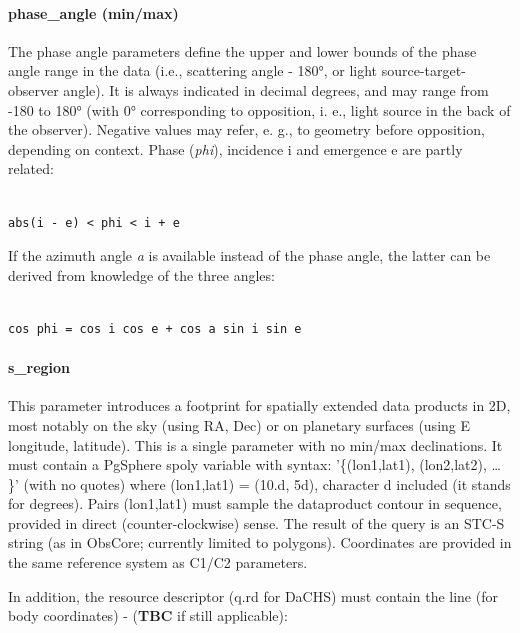 \documentclass[11pt,a4paper]{ivoa}
\begin{document}
\paragraph{phase\_angle (min/max)}

The phase angle parameters define the upper and lower bounds of the phase angle range in the data (i.e., scattering angle - 180°, or light source-target-observer angle). It is always indicated in decimal degrees, and may range from -180 to 180° (with 0° corresponding to opposition, i. e., light source in the back of the observer). Negative values may refer, e. g., to geometry before opposition, depending on context. Phase (\emph{phi}), incidence i and emergence e are partly related:

\begin{verbatim}

abs(i - e) < phi < i + e

\end{verbatim}

If the azimuth angle \emph{a} is available instead of the phase angle, the latter can be derived from knowledge of the three angles:

\begin{verbatim}

cos phi = cos i cos e + cos a sin i sin e

\end{verbatim}

\paragraph{s\_region}

This parameter introduces a footprint for spatially extended data products in 2D, most notably on the sky (using RA, Dec) or on planetary surfaces (using E longitude, latitude). This is a single parameter with no min/max declinations. It must contain a PgSphere spoly variable with syntax: '\{(lon1,lat1), (lon2,lat2), … \}' (with no quotes) where (lon1,lat1) = (10.d, 5d), character d included (it stands for degrees). Pairs (lon1,lat1) must sample the dataproduct contour in sequence, provided in direct (counter-clockwise) sense. The result of the query is an STC-S string (as in ObsCore; currently limited to polygons). Coordinates are provided in the same reference system as C1/C2 parameters.

In addition, the resource descriptor (q.rd for DaCHS) must contain the line (for body coordinates) - (\textbf{TBC} if still applicable):
\end{document}
